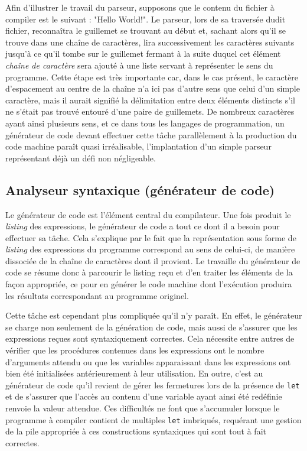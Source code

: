 \documentclass[12pt]{article}
\begin{document}
Afin d'illustrer le travail du parseur, supposons que le contenu du fichier à compiler est le suivant : "Hello World!". Le parseur, lors de sa traversée dudit fichier, reconnaîtra le guillemet se trouvant au début et, sachant alors qu'il se trouve dans une chaîne de caractères, lira successivement les caractères suivants jusqu'à ce qu'il tombe sur le guillemet fermant à la suite duquel cet élément \textit{chaîne de caractère} sera ajouté à une liste servant à représenter le sens du programme. Cette étape est très importante car, dans le cas présent, le caractère d'espacement au centre de la chaîne n'a ici pas d'autre sens que celui d'un simple caractère, mais il aurait signifié la délimitation entre deux éléments distincts s'il ne s'était pas trouvé entouré d'une paire de guillemets. De nombreux caractères ayant ainsi plusieurs sens, et ce dans tous les langages de programmation, un générateur de code devant effectuer cette tâche parallèlement à la production du code machine paraît quasi irréalisable, l'implantation d'un simple parseur représentant déjà un défi non négligeable.

\subsection{Analyseur syntaxique (générateur de code)}
Le générateur de code est l'élément central du compilateur. Une fois produit le \textit{listing} des expressions, le générateur de code a tout ce dont il a besoin pour effectuer sa tâche. Cela s'explique par le fait que la représentation sous forme de \textit{listing} des expressions du programme correspond au sens de celui-ci, de manière dissociée de la chaîne de caractères dont il provient. Le travaille du générateur de code se résume donc à parcourir le listing reçu et d'en traiter les éléments de la façon appropriée, ce pour en générer le code machine dont l'exécution produira les résultats correspondant au programme originel.

Cette tâche est cependant plus compliquée qu'il n'y paraît. En effet, le générateur se charge non seulement de la génération de code, mais aussi de s'assurer que les expressions reçues sont syntaxiquement correctes. Cela nécessite entre autres de vérifier que les procédures contenues dans les expressions ont le nombre d'arguments attendu ou que les variables apparaissant dans les expressions ont bien été initialisées antérieurement à leur utilisation. En outre, c'est au générateur de code qu'il revient de gérer les fermetures lors de la présence de \texttt{let} et de s'assurer que l'accès au contenu d'une variable ayant ainsi été redéfinie renvoie la valeur attendue. Ces difficultés ne font que s'accumuler lorsque le programme à compiler contient de multiples \texttt{let} imbriqués, requérant une gestion de la pile appropriée à ces constructions syntaxiques qui sont tout à fait correctes.
\end{document}
